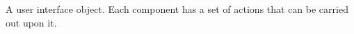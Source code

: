 \item[Component]{
A user interface object. Each component has a  set of actions 
that can be carried out upon it.
}
